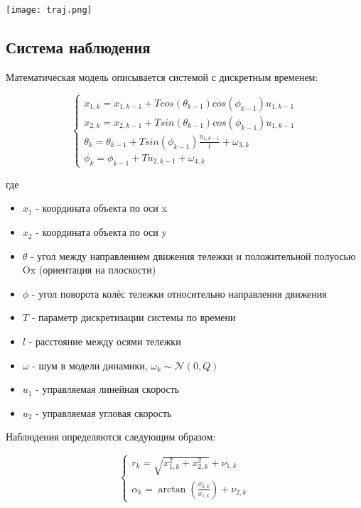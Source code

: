 \documentclass[12pt]{article}
\begin{document}
\texttt{[image: traj.png]}

\subsection{Система наблюдения}

Математическая модель описывается системой с дискретным временем:

\begin{equation*}
	\begin{cases}
		x_{1, k} = x_{1, k-1} + T cos(\theta_{k-1}) cos(\phi_{k-1}) u_{1, k-1}           \\
		x_{2, k} = x_{2, k-1} + T sin(\theta_{k-1}) cos(\phi_{k-1}) u_{1, k-1}           \\
		\theta_k = \theta_{k-1} + T sin(\phi_{k-1}) \frac{u_{1, k-1}}{l} + \omega_{3, k} \\
		\phi_k = \phi_{k-1} + T u_{2, k-1} + \omega_{4, k}
	\end{cases}
\end{equation*}

где

\begin{itemize}
	\item $x_1$ - координата объекта по оси x
	\item $x_2$ - координата объекта по оси y
	\item $\theta$ - угол между направлением движения тележки и положительной полуосью Ox (ориентация на плоскости)
	\item $\phi$ - угол поворота колёс тележки относительно направления движения
	\item $T$ - параметр дискретизации системы по времени
	\item $l$ - расстояние между осями тележки
	\item $\omega$ - шум в модели динамики, $\omega_k \sim \mathcal{N}(0, Q)$
	\item $u_1$ - управляемая линейная скорость
	\item $u_2$ - управляемая угловая скорость
\end{itemize}

Наблюдения определяются следующим образом:

\begin{equation*}
	\begin{cases}
		r_k = \sqrt{x_{1, k}^2 + x_{2, k}^2} + \nu_{1, k} \\
		\alpha_k = \arctan(\frac{x_{2, k}}{x_{1, k}}) + \nu_{2, k}
	\end{cases}
\end{equation*}
\end{document}
